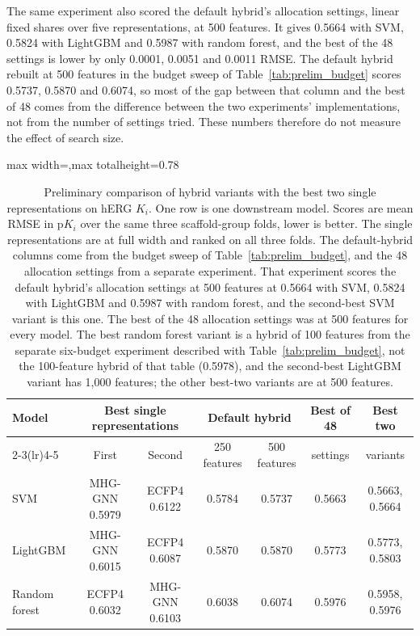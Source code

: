 The same experiment also scored the default hybrid's allocation settings, linear fixed shares over five representations, at 500 features. It gives 0.5664 with SVM, 0.5824 with LightGBM and 0.5987 with random forest, and the best of the 48 settings is lower by only 0.0001, 0.0051 and 0.0011 RMSE. The default hybrid rebuilt at 500 features in the budget sweep of Table~\ref{tab:prelim_budget} scores 0.5737, 0.5870 and 0.6074, so most of the gap between that column and the best of 48 comes from the difference between the two experiments' implementations, not from the number of settings tried. These numbers therefore do not measure the effect of search size.

\begin{table}[htbp]
\centering
\small
\begin{adjustbox}{max width=\textwidth,max totalheight=0.78\textheight}
\begin{tabular}{@{}lcccccc@{}}
\toprule
Model & \multicolumn{2}{c}{Best single representations} & \multicolumn{2}{c}{Default hybrid} & Best of 48 & Best two \\
\cmidrule(lr){2-3}\cmidrule(lr){4-5}
 & First & Second & 250 features & 500 features & settings & variants \\
\midrule
SVM & MHG-GNN 0.5979 & ECFP4 0.6122 & 0.5784 & 0.5737 & 0.5663 & 0.5663, 0.5664 \\
LightGBM & MHG-GNN 0.6015 & ECFP4 0.6087 & 0.5870 & 0.5870 & 0.5773 & 0.5773, 0.5803 \\
Random forest & ECFP4 0.6032 & MHG-GNN 0.6103 & 0.6038 & 0.6074 & 0.5976 & 0.5958, 0.5976 \\
\bottomrule
\end{tabular}
\end{adjustbox}
\caption[Preliminary: hybrid variants against the best two single representations on hERG $K_i$.]{Preliminary comparison of hybrid variants with the best two single representations on hERG $K_i$. One row is one downstream model. Scores are mean RMSE in p$K_i$ over the same three scaffold-group folds, lower is better. The single representations are at full width and ranked on all three folds. The default-hybrid columns come from the budget sweep of Table~\ref{tab:prelim_budget}, and the 48 allocation settings from a separate experiment. That experiment scores the default hybrid's allocation settings at 500 features at 0.5664 with SVM, 0.5824 with LightGBM and 0.5987 with random forest, and the second-best SVM variant is this one. The best of the 48 allocation settings was at 500 features for every model. The best random forest variant is a hybrid of 100 features from the separate six-budget experiment described with Table~\ref{tab:prelim_budget}, not the 100-feature hybrid of that table (0.5978), and the second-best LightGBM variant has 1,000 features; the other best-two variants are at 500 features.}
\label{tab:prelim_variants}
\end{table}

